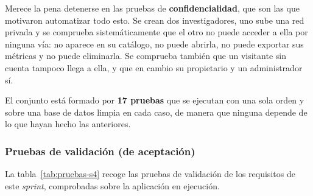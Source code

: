 Merece la pena detenerse en las pruebas de \textbf{confidencialidad}, que son las que motivaron
automatizar todo esto. Se crean dos investigadores, uno sube una red privada y se comprueba
sistemáticamente que el otro no puede acceder a ella por ninguna vía: no aparece en su catálogo, no
puede abrirla, no puede exportar sus métricas y no puede eliminarla. Se comprueba también que un
visitante sin cuenta tampoco llega a ella, y que en cambio su propietario y un administrador sí.

El conjunto está formado por \textbf{17 pruebas} que se ejecutan con una sola orden y sobre una base
de datos limpia en cada caso, de manera que ninguna depende de lo que hayan hecho las anteriores.

\subsubsection*{Pruebas de validación (de aceptación)}

La tabla~\ref{tab:pruebas-s4} recoge las pruebas de validación de los requisitos de este
\textit{sprint}, comprobadas sobre la aplicación en ejecución.

